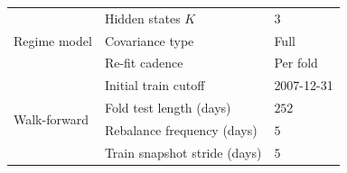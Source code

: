 \documentclass[11pt]{article}
\begin{document}
\begin{table}[h]
\begin{tabular}{lll}
\midrule
\multirow{3}{*}{Regime model}
& Hidden states $K$                                & $3$ \\
& Covariance type                                  & Full \\
& Re-fit cadence                                   & Per fold \\
\midrule
\multirow{4}{*}{Walk-forward}
& Initial train cutoff                             & 2007-12-31 \\
& Fold test length (days)                          & $252$ \\
& Rebalance frequency (days)                       & $5$ \\
& Train snapshot stride (days)                     & $5$ \\
\bottomrule
\end{tabular}
\end{table}
\end{document}
